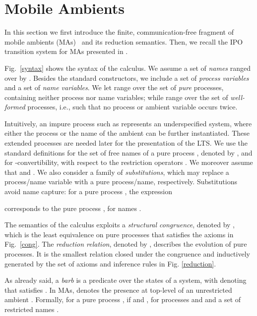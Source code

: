 \documentclass[copyright,creativecommons]{eptcs}
\newcommand{\<}{\langle}
\renewcommand{\>}{\rangle}
\begin{document}
\section{Mobile Ambients} \label{sec:MA}

In this section we first introduce the finite, communication-free fragment
of mobile ambients (MAs)~\cite{CG:MAmb} and its reduction semantics.
Then, we recall the IPO transition system for MAs presented in \cite{BoGaMo}.

Fig.~\ref{syntax} shows the syntax of the calculus. We assume a set
 of \emph{names} ranged over by .
Besides the standard constructors, we include a set 
of \emph{process variables} and a set  of \emph{name
  variables}.
We let  range over the set of \emph{pure} processes,
containing neither process nor name variables; while  range over the set of
\emph{well-formed} processes, i.e., such that no process or ambient
variable occurs twice.

Intuitively, an impure process such as  represents an
underspecified system, where either the process  or the name
of the ambient  can be further instantiated. These extended
processes are needed later for the presentation of the LTS.
We use the standard definitions for the set of free names of a pure
process , denoted by , and for -convertibility,
with respect to the restriction operators . We moreover
assume that  and .
We also consider a family of \emph{substitutions}, which may replace a
process/name variable with a pure process/name, respectively.
Substitutions avoid name capture: for a pure process , the
expression

corresponds to the pure process
,
for names .

The semantics of the calculus
exploits a \emph{structural congruence}, denoted by , which is
the least equivalence on pure processes that satisfies the axioms in
Fig.~\ref{cong}.
The \emph{reduction relation}, denoted by ,
describes the evolution of pure processes.
It is the smallest relation closed under the congruence  and
inductively generated by the set of axioms and inference rules in Fig. \ref{reduction}.

As already said, a \emph{barb}  is a predicate over the states of a system,
with  denoting that  satisfies .  In MAs, 
denotes the presence at top-level of an unrestricted ambient
. Formally, for a pure process ,  if  and , for processes  and  and a
set of restricted names .
\end{document}

